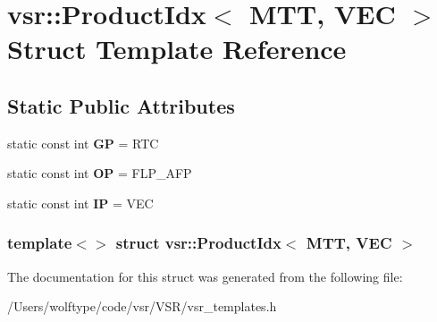 \hypertarget{structvsr_1_1_product_idx_3_01_m_t_t_00_01_v_e_c_01_4}{\section{vsr\-:\-:Product\-Idx$<$ M\-T\-T, V\-E\-C $>$ Struct Template Reference}
\label{structvsr_1_1_product_idx_3_01_m_t_t_00_01_v_e_c_01_4}
}
\subsection*{Static Public Attributes}
\begin{DoxyCompactItemize}
\item 
\hypertarget{structvsr_1_1_product_idx_3_01_m_t_t_00_01_v_e_c_01_4_ad06bde1b3fcac11bbb2fe17325546ed8}{static const int {\bfseries G\-P} = R\-T\-C}\label{structvsr_1_1_product_idx_3_01_m_t_t_00_01_v_e_c_01_4_ad06bde1b3fcac11bbb2fe17325546ed8}

\item 
\hypertarget{structvsr_1_1_product_idx_3_01_m_t_t_00_01_v_e_c_01_4_ae2e739c3799730c6d72342ffc23ceb23}{static const int {\bfseries O\-P} = F\-L\-P\-\_\-\-A\-F\-P}\label{structvsr_1_1_product_idx_3_01_m_t_t_00_01_v_e_c_01_4_ae2e739c3799730c6d72342ffc23ceb23}

\item 
\hypertarget{structvsr_1_1_product_idx_3_01_m_t_t_00_01_v_e_c_01_4_a3dfaa8f67500c6741a7404771886171e}{static const int {\bfseries I\-P} = V\-E\-C}\label{structvsr_1_1_product_idx_3_01_m_t_t_00_01_v_e_c_01_4_a3dfaa8f67500c6741a7404771886171e}

\end{DoxyCompactItemize}
\subsubsection*{template$<$$>$ struct vsr\-::\-Product\-Idx$<$ M\-T\-T, V\-E\-C $>$}



The documentation for this struct was generated from the following file\-:\begin{DoxyCompactItemize}
\item 
/\-Users/wolftype/code/vsr/\-V\-S\-R/vsr\-\_\-templates.\-h\end{DoxyCompactItemize}
